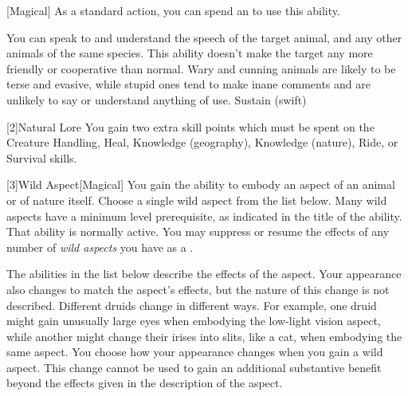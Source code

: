             [Magical] As a standard action, you can spend an  to use this ability.
            \begin{ability}
                \begin{spelltargetinginfo}
                \end{spelltargetinginfo}
                \begin{spelleffects}
                    \spelleffect You can speak to and understand the speech of the target animal, and any other animals of the same species.
                    This ability doesn't make the target any more friendly or cooperative than normal.
                    Wary and cunning animals are likely to be terse and evasive, while stupid ones tend to make inane comments and are unlikely to say or understand anything of use.
                    \spelldur Sustain (swift)
                \end{spelleffects}
            \end{ability}

            [2]{Natural Lore}
            You gain two extra skill points which must be spent on the Creature Handling, Heal, Knowledge (geography), Knowledge (nature), Ride, or Survival skills.

            [3]{Wild Aspect}[Magical]
            You gain the ability to embody an aspect of an animal or of nature itself.
            Choose a single wild aspect from the list below.
            Many wild aspects have a minimum level prerequisite, as indicated in the title of the ability.
            That ability is normally active.
            You may suppress or resume the effects of any number of \textit{wild aspects} you have as a .

            The abilities in the list below describe the effects of the aspect.
            Your appearance also changes to match the aspect's effects, but the nature of this change is not described.
            Different druids change in different ways.
            For example, one druid might gain unusually large eyes when embodying the low-light vision aspect, while another might change their irises into slits, like a cat, when embodying the same aspect.
            You choose how your appearance changes when you gain a wild aspect.
            This change cannot be used to gain an additional substantive benefit beyond the effects given in the description of the aspect.


